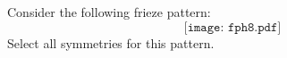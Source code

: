\documentclass{ximera}
\author{Bart Snapp}
\begin{document}
\begin{exercise}
  Consider the following frieze pattern:
  \[
  \texttt{[image: fph8.pdf]}
  \]
  Select all symmetries for this pattern.
  \begin{selectAll}
  \end{selectAll}
\end{exercise}
\end{document}
